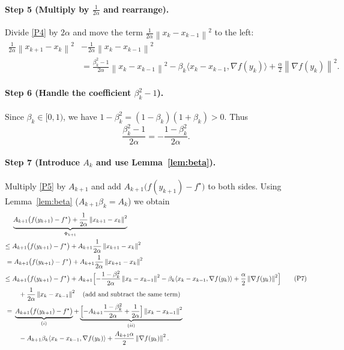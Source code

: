 \documentclass{article}
\newcommand{\norm}[1]{\left\lVert #1\right\rVert}
\begin{document}
\paragraph{Step 5 (Multiply by $\frac{1}{2\alpha}$ and rearrange).}  
Divide \eqref{P4} by $2\alpha$ and move the term $\frac{1}{2\alpha}\norm{x_k-x_{k-1}}^{2}$ to the left:
\[
\begin{aligned}
\frac{1}{2\alpha}\norm{x_{k+1}-x_k}^{2}
&-\frac{1}{2\alpha}\norm{x_k-x_{k-1}}^{2}\\
&= \frac{\beta_k^{2}-1}{2\alpha}\norm{x_k-x_{k-1}}^{2}
   -\beta_k\langle x_k-x_{k-1},\nabla f(y_k)\rangle
   +\frac{\alpha}{2}\norm{\nabla f(y_k)}^{2}.
\end{aligned}
\tag{P5}
\]

\paragraph{Step 6 (Handle the coefficient $\beta_k^{2}-1$).}  
Since $\beta_k\in[0,1)$, we have $1-\beta_k^{2}= (1-\beta_k)(1+\beta_k) >0$.  
Thus
\[
\frac{\beta_k^{2}-1}{2\alpha}= -\frac{1-\beta_k^{2}}{2\alpha}.
\tag{P6}
\]

\paragraph{Step 7 (Introduce $A_k$ and use Lemma~\ref{lem:beta}).}  
Multiply \eqref{P5} by $A_{k+1}$ and add $A_{k+1}\bigl(f(y_{k+1})-f^\star\bigr)$ to both sides. Using Lemma~\ref{lem:beta} ($A_{k+1}\beta_k=A_k$) we obtain
\[
\begin{aligned}
&\underbrace{A_{k+1}\bigl(f(y_{k+1})-f^\star\bigr)
+\frac{1}{2\alpha}\norm{x_{k+1}-x_k}^{2}}_{\Phi_{k+1}}\\
\le\;& A_{k+1}\bigl(f(y_{k+1})-f^\star\bigr)
+ A_{k+1}\frac{1}{2\alpha}\norm{x_{k+1}-x_k}^{2}\\
=&\; A_{k+1}\bigl(f(y_{k+1})-f^\star\bigr)
+ A_{k+1}\frac{1}{2\alpha}\norm{x_{k+1}-x_k}^{2}\\
\le\;& A_{k+1}\bigl(f(y_{k+1})-f^\star\bigr)
+ A_{k+1}\Bigl[ -\frac{1-\beta_k^{2}}{2\alpha}\norm{x_k-x_{k-1}}^{2}
   -\beta_k\langle x_k-x_{k-1},\nabla f(y_k)\rangle
   +\frac{\alpha}{2}\norm{\nabla f(y_k)}^{2}\Bigr]\\
&\quad +\frac{1}{2\alpha}\norm{x_k-x_{k-1}}^{2}
   \quad\text{(add and subtract the same term)}\\
=&\; \underbrace{A_{k+1}\bigl(f(y_{k+1})-f^\star\bigr)}_{(i)}
   +\underbrace{\Bigl[-A_{k+1}\frac{1-\beta_k^{2}}{2\alpha}
      +\frac{1}{2\alpha}\Bigr]\norm{x_k-x_{k-1}}^{2}}_{(ii)}\\
   &\quad -A_{k+1}\beta_k\langle x_k-x_{k-1},\nabla f(y_k)\rangle
      +\frac{A_{k+1}\alpha}{2}\norm{\nabla f(y_k)}^{2}.
\end{aligned}
\tag{P7}
\]
\end{document}
